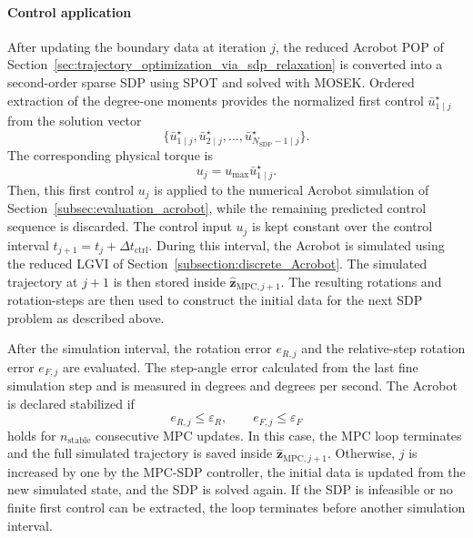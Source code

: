 \paragraph{Control application}
After updating the boundary data at iteration \(j\), the reduced Acrobot POP
of Section~\ref{sec:trajectory_optimization_via_sdp_relaxation} is converted
into a second-order sparse SDP using SPOT and solved with MOSEK. Ordered
extraction of the degree-one moments provides the normalized first control
\(\bar u_{1\mid j}^{\star}\) from the solution vector 
\[\{\bar u_{1\mid j}^{\star}, \bar u_{2\mid j}^{\star},\dots, \bar u_{N_{\mathrm{SDP}}-1\mid j}^{\star}\}.\] The corresponding physical torque is
\begin{equation}
    u_j
    =
    u_{\max}\bar u_{1\mid j}^{\star}.
    \label{eq:acrobot_mpc_applied_control}
\end{equation}
Then, this first control $u_j$ is applied to the numerical Acrobot simulation 
of Section~\ref{subsec:evaluation_acrobot}, while the
remaining predicted control sequence is discarded. The control input
\(u_j\) is kept constant over the control interval 
$t_{j+1}=t_j+\Delta t_{\mathrm{ctrl}}$.
During this interval, the Acrobot is simulated using the reduced LGVI of
Section~\ref{subsection:discrete_Acrobot}. The simulated
trajectory at $j+1$ is then stored inside $\widehat{\bm{z}}_{\mathrm{MPC},j+1}$.
The resulting rotations and
rotation-steps are then used to construct the initial data for
the next SDP problem as described above. 

After the simulation interval, the rotation error \(e_{R,j}\) and the
relative-step rotation error \(e_{F,j}\) are evaluated. The
step-angle error calculated from the last fine simulation step and is measured
in degrees and degrees per second. The Acrobot is declared
stabilized if
\begin{equation}
    e_{R,j}\leq\varepsilon_R,
    \qquad
    e_{F,j}\leq\varepsilon_F
    \label{eq:acrobot_mpc_stabilization_condition}
\end{equation}
holds for \(n_{\mathrm{stable}}\) consecutive MPC updates. In this case, the
MPC loop terminates and the full simulated trajectory is 
saved inside $\widehat{\bm{z}}_{\mathrm{MPC},j+1}$. 
Otherwise, \(j\) is increased by one by the 
MPC-SDP controller, the initial data
is updated from the new simulated state, and the SDP is solved again. If the
SDP is infeasible or no finite first control can be extracted, the loop
terminates before another simulation interval.

